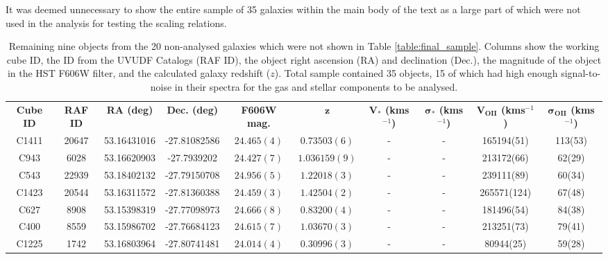 \documentclass[12pt, twocolumn, nofootinbib]{revtex4-1}    %
\begin{document}
It was deemed unnecessary to show the entire sample of 35 galaxies within the main body of the text as a large part of which were not used in the analysis for testing the scaling relations.

\begin{table}
\centering
\begin{tabular}{c@{\hskip 10pt}c@{\hskip 10pt}c@{\hskip 10pt}c@{\hskip 10pt}c@{\hskip 10pt}c@{\hskip 10pt}c@{\hskip 10pt}c@{\hskip 10pt}c@{\hskip 10pt}c} 
 \hline
 \textbf{Cube ID} & \textbf{RAF ID} & \textbf{RA (deg)} & \textbf{Dec. (deg)} & \textbf{F606W mag.} & \textbf{$\boldsymbol{z}$} & \textbf{$\boldsymbol{V_*}$ (kms$^{-1}$)} & \textbf{$\boldsymbol{\sigma_*}$ (kms$^{-1}$)} & \textbf{$\boldsymbol{V_{OII}}$ (kms$^{-1}$)} & \textbf{$\boldsymbol{\sigma_{OII}}$ (kms$^{-1}$)} \\ [0.5ex]  
C1411 & 20647 & 53.16431016 & -27.81082586 & $24.465(4)$ & $0.73503(6)$ & - & - & 165194(51) & 113(53) \\ 

C943 & 6028 & 53.16620903 & -27.7939202 & $24.427(7)$ & $1.036159(9)$ & - & - & 213172(66) & 62(29) \\ 

C543 & 22939 & 53.18402132 & -27.79150708 & $24.956(5)$ & $1.22018(3)$ & - & - & 239111(89) & 60(34) \\ 

C1423 & 20544 & 53.16311572 & -27.81360388 & $24.459(3)$ & $1.42504(2)$ & - & - & 265571(124) & 67(48) \\ 

C627 & 8908 & 53.15398319 & -27.77098973 & $24.666(8)$ & $0.83200(4)$ & - & - & 181496(54) & 84(38) \\ 

C400 & 8559 & 53.15986702 & -27.76684123 & $24.615(7)$ & $1.03670(3)$ & - & - & 213251(73) & 79(41) \\ 

C1225 & 1742 & 53.16803964 & -27.80741481 & $24.014(4)$ & $0.30996(3)$ & - & - & 80944(25) & 59(28) \\
 \hline
\end{tabular}
\caption{Remaining nine objects from the 20 non-analysed galaxies which were not shown in Table \ref{table:final_sample}. Columns show the working cube ID, the ID from the UVUDF Catalogs \citep{2015AJ....150...31R} (RAF ID), the object right ascension (RA) and declination (Dec.), the magnitude of the object in the HST F606W filter, and the calculated galaxy redshift ($z$). Total sample contained 35 objects, 15 of which had high enough signal-to-noise in their spectra for the gas and stellar components to be analysed.}
\label{table:rest_of_final_sample}
\end{table}
\end{document}
